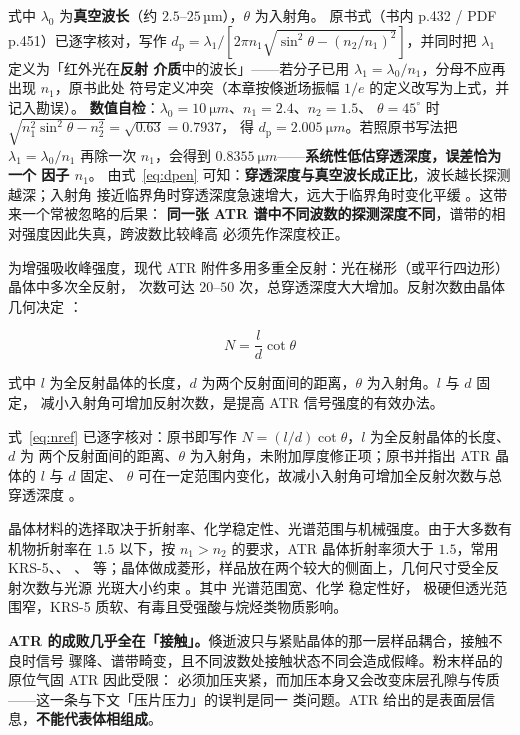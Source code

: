 式中 $\lambda_{0}$ 为\textbf{真空波长}（约 $2.5$--$25$\,µm），$\theta$ 为入射角。
原书式（书内 p.432 / PDF p.451）已逐字核对，写作 $d_{\mathrm{p}}=\lambda_{1}/[2\pi n_{1}
\sqrt{\sin^{2}\theta-(n_{2}/n_{1})^{2}}]$，并同时把 $\lambda_{1}$ 定义为「红外光在\textbf{反射
介质}中的波长」——若分子已用 $\lambda_{1}=\lambda_{0}/n_{1}$，分母不应再出现 $n_{1}$，原书此处
符号定义冲突（本章按倏逝场振幅 $1/e$ 的定义改写为上式，并记入勘误）。
\textbf{数值自检}：$\lambda_{0}=\qty{10}{\micro m}$、$n_{1}=2.4$、$n_{2}=1.5$、
$\theta=45^\circ$ 时 $\sqrt{n_{1}^{2}\sin^{2}\theta-n_{2}^{2}}=\sqrt{0.63}=0.7937$，
得 $d_{\mathrm{p}}=\qty{2.005}{\micro m}$。若照原书写法把 $\lambda_{1}=\lambda_{0}/n_{1}$
再除一次 $n_{1}$，会得到 $\qty{0.8355}{\micro m}$——\textbf{系统性低估穿透深度，误差恰为一个
因子 $n_{1}$}。
由式~\eqref{eq:dpen} 可知：\textbf{穿透深度与真空波长成正比}，波长越长探测越深；入射角
接近临界角时穿透深度急速增大，远大于临界角时变化平缓
。这带来一个常被忽略的后果：
\textbf{同一张 ATR 谱中不同波数的探测深度不同}，谱带的相对强度因此失真，跨波数比较峰高
必须先作深度校正。

为增强吸收峰强度，现代 ATR 附件多用多重全反射：光在梯形（或平行四边形）晶体中多次全反射，
次数可达 $20$--$50$ 次，总穿透深度大大增加。反射次数由晶体几何决定
：

\begin{equation}\label{eq:nref}
N=\frac{l}{d}\cot\theta
\end{equation}

式中 $l$ 为全反射晶体的长度，$d$ 为两个反射面间的距离，$\theta$ 为入射角。$l$ 与 $d$ 固定，
减小入射角可增加反射次数，是提高 ATR 信号强度的有效办法。

式~\eqref{eq:nref} 已逐字核对：原书即写作 $N=(l/d)\cot\theta$，$l$ 为全反射晶体的长度、$d$ 为
两个反射面间的距离、$\theta$ 为入射角，未附加厚度修正项；原书并指出 ATR 晶体的 $l$ 与 $d$ 固定、
$\theta$ 可在一定范围内变化，故减小入射角可增加全反射次数与总穿透深度
。

晶体材料的选择取决于折射率、化学稳定性、光谱范围与机械强度。由于大多数有机物折射率在
$1.5$ 以下，按 $n_{1}>n_{2}$ 的要求，ATR 晶体折射率须大于 $1.5$，常用 KRS-5、、
、 等；晶体做成菱形，样品放在两个较大的侧面上，几何尺寸受全反射次数与光源
光斑大小约束 。其中  光谱范围宽、化学
稳定性好， 极硬但透光范围窄，KRS-5 质软、有毒且受强酸与烷烃类物质影响。

\begin{pitfall}
\textbf{ATR 的成败几乎全在「接触」。}倏逝波只与紧贴晶体的那一层样品耦合，接触不良时信号
骤降、谱带畸变，且不同波数处接触状态不同会造成假峰。粉末样品的原位气固 ATR 因此受限：
必须加压夹紧，而加压本身又会改变床层孔隙与传质——这一条与下文「压片压力」的误判是同一
类问题。ATR 给出的是表面层信息，\textbf{不能代表体相组成}。
\end{pitfall}

